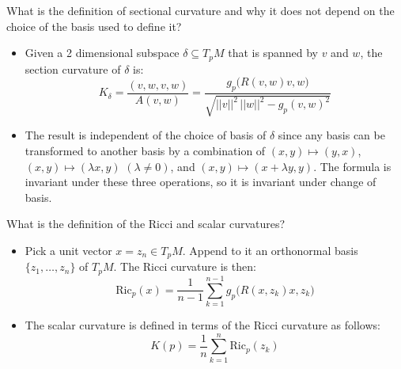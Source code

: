 \documentclass{beamer}
\begin{document}
    \begin{frame}
        What is the definition of sectional curvature and why it does not
        depend on the choice of the basis used to define it?
        \begin{itemize}
            \item Given a 2 dimensional subspace $\delta\subseteq{T}_{p}M$ that
                is spanned by $v$ and $w$, the section curvature of $\delta$ is:
                \begin{equation}
                    K_{\delta}=\frac{(v,w,v,w)}{A(v,w)}
                        =\frac{g_{p}\big(R(v,w)v,w\big)}{\sqrt{||v||^{2}\,||w||^{2}-g_{p}(v,w)^{2}}}
                \end{equation}
            \item The result is independent of the choice of basis of $\delta$
                since any basis can be transformed to another basis by a
                combination of $(x,y)\mapsto(y,x)$,
                $(x,y)\mapsto(\lambda{x},y)$ $(\lambda\ne{0})$, and
                $(x,y)\mapsto(x+\lambda{y},y)$. The formula is invariant under
                these three operations, so it is invariant under change of
                basis.
        \end{itemize}
    \end{frame}
    \begin{frame}
        What is the definition of the Ricci and scalar curvatures?
        \begin{itemize}
            \item Pick a unit vector $x=z_{n}\in{T}_{p}M$. Append to it an
                orthonormal basis $\{z_{1},\dots,z_{n}\}$ of $T_{p}M$.
                The Ricci curvature is then:
                \begin{equation}
                    \textrm{Ric}_{p}(x)=
                        \frac{1}{n-1}\sum_{k=1}^{n-1}
                            g_{p}\Big(R(x,z_{k})x,z_{k}\Big)
                \end{equation}
            \item The scalar curvature is defined in terms of the Ricci
                curvature as follows:
                \begin{equation}
                    K(p)=\frac{1}{n}
                        \sum_{k=1}^{n}\textrm{Ric}_{p}(z_{k})
                \end{equation}
        \end{itemize}
    \end{frame}
\end{document}
